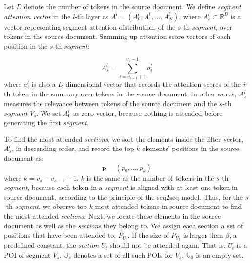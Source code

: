 \documentclass{nle}
\theoremstyle{definition}
\begin{document}
Let $D$ denote the number of tokens in the source document.
We define \textit{segment attention vector} in the $l$-th layer as 
$A^{l} = (A_{0}^{l}, A_{1}^{l},..., A_{N}^{l})$, 
where $A_s^l\subset \mathbb{R}^{D}$ is a vector representing 
segment attention distribution, of the $s$-th \textit{segment},
over tokens in the source document. Summing up attention score vectors 
of each position in the $s$-th \textit{segment}:

\begin{equation}
	A_{s}^{l} = \sum_{i=v_{s-1}+1}^{v_{s}-1}a_{i}^{l}
\end{equation}
where $a_i^l$ is also a $D$-dimensional vector that records 
the attention scores of the $i$-th token in the summary over 
tokens in the source document. In other words, $ A_{s}^{l}$ 
measures the relevance between tokens of the source document and 
the $s$-th \textit{segment} $V_s$. 
We set $A_{0}^{l}$ as zero vector, because nothing is attended before generating 
the first \textit{segment}. 


To find the most attended \textit{sections}, 
we sort the elements inside the filter vector, 
$A_{s}^{l}$, in descending order, 
and record the top $k$ elements' positions in 
the source document as: 
\begin{equation}
	\mathbf{p}=(p_{0},...,p_{k})
\end{equation}
where $k=v_{s}-v_{s-1}-1$. 
$k$ is the same as the number of tokens in the $s$-th \textit{segment},
because each token in a \textit{segment} is aligned with at least one token in source document, according to the principle of the seq2seq model.
Thus, for the $s$-th \textit{segment}, 
we observe top $k$ most attended tokens in source document to find the most attended \textit{sections}.
Next, we locate these elements in the source document as well as
the \textit{sections} they belong to. 
We assign each section a set of positions that have been attended to, 
$P_{U_{t}}$. 
If the size of $P_{U_{t}}$ is larger than
$\beta$, a predefined constant,
the \textit{section} $U_{t}$ should not be attended again. 
That is, $U_{t}$ is a POI of segment $V_{s}$.
$\mathbb{U}_{s}$ denotes a set of all such POIs for $V_s$.
$\mathbb{U}_{0}$ is an empty set.
\end{document}
